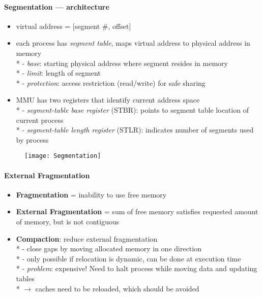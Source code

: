 \paragraph{Segmentation --- architecture}
\begin{itemize}
  \item virtual address = [segment \#, offset]
  \item each process has \emph{segment table}, maps virtual address to physical address in memory \\*
    - \emph{base}: starting physical address where segment resides in memory \\*
    - \emph{limit}: length of segment \\*
    - \emph{protection}: access restriction (read/write) for safe sharing
  \item MMU has two registers that identify current address space \\*
    - \emph{segment-table base register} (STBR): points to segment table location of current process \\*
    - \emph{segment-table length register} (STLR): indicates number of segments used by process
\end{itemize}
\begin{figure}[h]\centering\label{Segmentation}\texttt{[image: Segmentation]}\end{figure}

\paragraph{External Fragmentation}
\begin{itemize}
  \item \textbf{Fragmentation} = inability to use free memory
  \item \textbf{External Fragmentation} = sum of free memory satisfies requested amount of memory, but is not contiguous
  \item \textbf{Compaction}: reduce external fragmentation \\*
    - close gaps by moving allocated memory in one direction \\*
    - only possible if relocation is dynamic, can be done at execution time \\*
    - \emph{problem}: expensive! Need to halt process while moving data and updating tables \\*
      \phantom{-} \( \to \) caches need to be reloaded, which should be avoided
\end{itemize}

